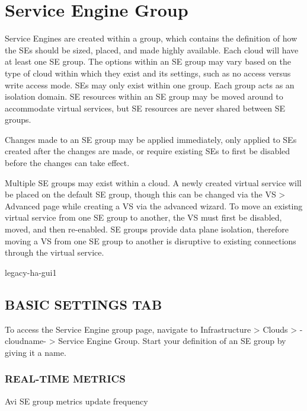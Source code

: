 \documentclass[letterpaper,10pt,english]{sphinxmanual}
\begin{document}
\section{Service Engine Group}
\label{\detokenize{getting_started/service_engine_group::doc}}\label{\detokenize{getting_started/service_engine_group:service-engine-group}}
Service Engines are created within a group, which contains the definition of how the SEs should be sized, placed, and made highly available. Each cloud will have at least one SE group.  The options within an SE group may vary based on the type of cloud within which they exist and its settings, such as no access versus write access mode.  SEs may only exist within one group.  Each group acts as an isolation domain.  SE resources within an SE group may be moved around to accommodate virtual services, but SE resources are never shared between SE groups.

Changes made to an SE group may be applied immediately, only applied to SEs created after the changes are made, or require existing SEs to first be disabled before the changes can take effect.

Multiple SE groups may exist within a cloud.  A newly created virtual service will be placed on the default SE group, though this can be changed via the VS \textgreater{} Advanced page while creating a VS via the advanced wizard.  To move an existing virtual service from one SE group to another, the VS must first be disabled, moved, and then re-enabled.  SE groups provide data plane isolation, therefore moving a VS from one SE group to another is disruptive to existing connections through the virtual service.

legacy-ha-gui1


\subsection{BASIC SETTINGS TAB}
\label{\detokenize{getting_started/service_engine_group:basic-settings-tab}}
To access the Service Engine group page, navigate to Infrastructure \textgreater{} Clouds \textgreater{} -cloudname- \textgreater{} Service Engine Group. Start your definition of an SE group by giving it a name.


\subsubsection{REAL-TIME METRICS}
\label{\detokenize{getting_started/service_engine_group:real-time-metrics}}
Avi SE group metrics update frequency
\end{document}
